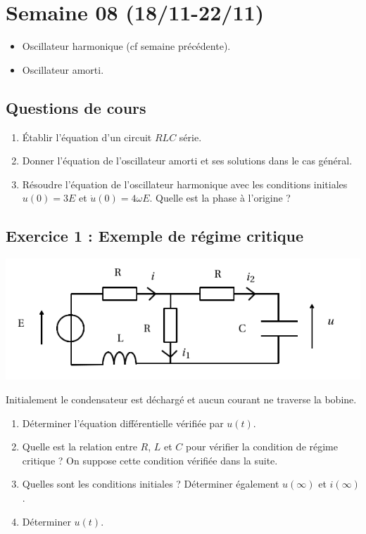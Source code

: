 \section{Semaine 08 (18/11-22/11) }


\begin{itemize}
	\item Oscillateur harmonique (cf semaine précédente).
	\item Oscillateur amorti.
\end{itemize}

\subsection{Questions de cours}

\begin{enumerate}
	\item Établir l'équation d'un circuit $RLC$ série.
	\item Donner l'équation de l'oscillateur amorti et ses solutions dans le cas général.
	\item Résoudre l'équation de l'oscillateur harmonique avec les conditions initiales $u(0)=3E$ et $\dot{u}(0)=4 \omega E$. Quelle est la phase à l'origine ?
\end{enumerate}

\subsection{Exercice 1 : Exemple de régime critique}

\begin{minipage}[c]{\linewidth/2}
	\includegraphics[width=\textwidth]{./Images/mpsi_s08_ex01.png}
\end{minipage}%
\begin{minipage}[c]{\linewidth/2}
	Initialement le condensateur est déchargé et aucun courant ne traverse la bobine.
\end{minipage}

\begin{enumerate}
	\item Déterminer l'équation différentielle vérifiée par $u(t)$.
	\item Quelle est la relation entre $R$, $L$ et $C$ pour vérifier la condition de régime critique ? On suppose cette condition vérifiée dans la suite.
	\item Quelles sont les conditions initiales ? Déterminer également $u(\infty)$ et $i(\infty)$.
	\item Déterminer $u(t)$.
\end{enumerate}

